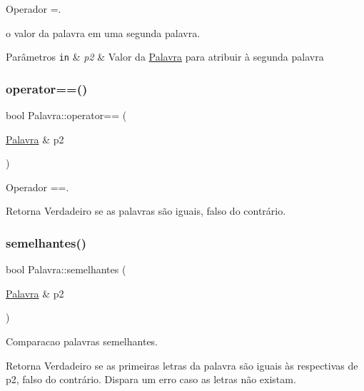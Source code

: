 Operador =. 

o valor da palavra em uma segunda palavra. 
\begin{DoxyParams}[1]{Parâmetros}
\mbox{\tt in}  & {\em p2} & Valor da \hyperlink{classPalavra}{Palavra} para atribuir à segunda palavra \\
\hline
\end{DoxyParams}
\mbox{\label{classPalavra_a0db696a5fd0261a07d35d367a114afa7}} 
\subsubsection{\texorpdfstring{operator==()}{operator==()}}
{\footnotesize\ttfamily bool Palavra\+::operator== (\begin{DoxyParamCaption}\item[{\hyperlink{classPalavra}{Palavra} \&}]{p2 }\end{DoxyParamCaption})}



Operador ==. 

\begin{DoxyReturn}{Retorna}
Verdadeiro se as palavras são iguais, falso do contrário. 
\end{DoxyReturn}
\mbox{\label{classPalavra_ae3c7cea7ef6603efb3899adc34dba9d8}} 
\subsubsection{\texorpdfstring{semelhantes()}{semelhantes()}}
{\footnotesize\ttfamily bool Palavra\+::semelhantes (\begin{DoxyParamCaption}\item[{\hyperlink{classPalavra}{Palavra} \&}]{p2 }\end{DoxyParamCaption})}



Comparacao palavras semelhantes. 

\begin{DoxyReturn}{Retorna}
Verdadeiro se as primeiras letras da palavra são iguais às respectivas de p2, falso do contrário. Dispara um erro caso as letras não existam. 
\end{DoxyReturn}
\mbox{\label{classPalavra_a77fbc808d5749f73a2974b7276a0d000}} 
